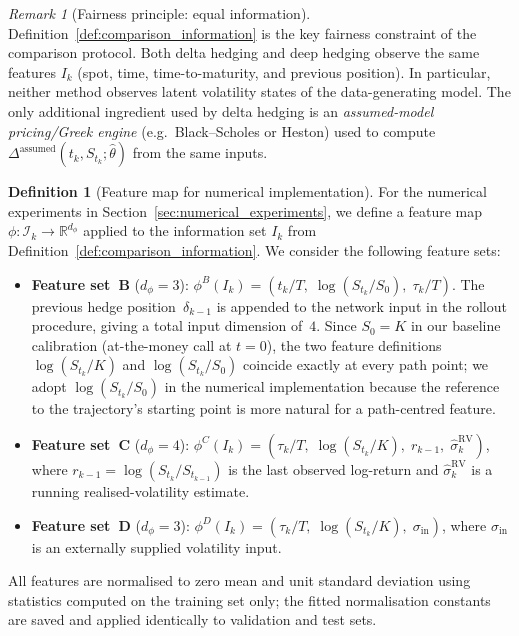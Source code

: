 \documentclass[12pt,a4paper]{article}
\theoremstyle{definition}
\newtheorem{definition}{Definition}[section]
\theoremstyle{plain}
\theoremstyle{remark}
\newtheorem{remark}{Remark}[section]
\theoremstyle{plain}
\begin{document}
\begin{remark}[Fairness principle: equal information]
\label{rem:fairness_equal_information}
Definition~\ref{def:comparison_information} is the key fairness constraint of the comparison protocol.
Both delta hedging and deep hedging observe the same features $I_k$ (spot, time, time-to-maturity, and previous position).
In particular, neither method observes latent volatility states of the data-generating model.
The only additional ingredient used by delta hedging is an \emph{assumed-model pricing/Greek engine} (e.g.\ Black--Scholes or Heston) used to compute $\Delta^{\mathrm{assumed}}(t_k,S_{t_k};\hat\theta)$ from the same inputs.
\end{remark}

\begin{definition}[Feature map for numerical implementation]
\label{def:feature-map}
For the numerical experiments in Section~\ref{sec:numerical_experiments}, we define a feature map
$\phi\colon \mathcal{I}_k \to \mathbb{R}^{d_\phi}$ applied to the information
set $I_k$ from Definition~\ref{def:comparison_information}. We consider the following
feature sets:
\begin{itemize}
  \item \textbf{Feature set~B} ($d_\phi = 3$): $\phi^B(I_k) = (t_k / T,\;
        \log(S_{t_k}/S_0),\; \tau_k / T)$. The previous hedge position~$\delta_{k-1}$ is
        appended to the network input in the rollout procedure, giving a
        total input dimension of~$4$. Since $S_0 = K$ in our baseline calibration (at-the-money call at $t = 0$), the two feature definitions $\log(S_{t_k}/K)$ and $\log(S_{t_k}/S_0)$ coincide exactly at every path point; we adopt $\log(S_{t_k}/S_0)$ in the numerical implementation because the reference to the trajectory's starting point is more natural for a path-centred feature.
  \item \textbf{Feature set~C} ($d_\phi = 4$): $\phi^C(I_k) = (\tau_k / T,\;
        \log(S_{t_k}/K),\; r_{k-1},\; \widehat{\sigma}^{\mathrm{RV}}_k)$,
        where $r_{k-1} = \log(S_{t_k}/S_{t_{k-1}})$ is the last observed
        log-return and $\widehat{\sigma}^{\mathrm{RV}}_k$ is a running
        realised-volatility estimate.
  \item \textbf{Feature set~D} ($d_\phi = 3$): $\phi^D(I_k) = (\tau_k / T,\;
        \log(S_{t_k}/K),\; \sigma_{\mathrm{in}})$, where $\sigma_{\mathrm{in}}$
        is an externally supplied volatility input.
\end{itemize}
All features are normalised to zero mean and unit standard deviation
using statistics computed on the training set only; the fitted normalisation
constants are saved and applied identically to validation and test sets.
\end{definition}
\end{document}
